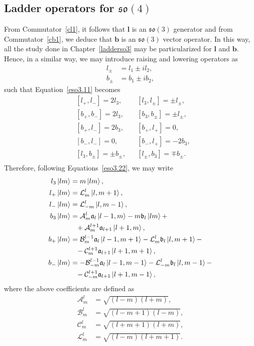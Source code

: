 \documentclass[12pt,a4paper]{report}
\theoremstyle{definition}
\theoremstyle{remark}
\theoremstyle{remark}
\begin{document}
\subsection{Ladder operators for $\mathfrak{so}(4)$}
From Commutator~\ref{cl1}, it follows that $\mathbf{l}$ is an $\mathfrak{so}(3)$ generator and from Commutator~\ref{cb1}, we deduce that $\mathbf{b}$ is an $\mathfrak{so}(3)$ vector operator. In this way, all the study done in Chapter~\ref{ladderso3} may be particularized for $\mathbf{l}$ and $\mathbf{b}$. Hence, in a similar way, we may introduce raising and lowering operators as
\begin{align*}
l_\pm&=l_1\pm il_2,\\
b_\pm&=b_1\pm ib_2,
\end{align*}
such that Equation~\ref{eso3.11} becomes
\begin{equation}\label{eso4.6}
\begin{aligned}
&[l_+,l_-]=2l_3, && [l_3,l_\pm]=\pm l_\pm,\\
&[b_+,b_-]=2l_3, && [b_3,b_\pm]=\pm l_\pm,\\
&[b_+,l_-]=2b_3, &&[b_+,l_+]=0, \\
&[b_-,l_-]=0, &&[b_-,l_+]=-2b_3, \\
&[l_3,b_\pm]=\pm b_\pm, &&[l_\pm,b_3]=\mp b_\pm. \\
\end{aligned}
\end{equation}
Therefore, following Equations~\ref{eso3.22}, we may write
\begin{align*}
l_3\ket{lm}&=m\ket{lm},\\
l_+\ket{lm}&=\mathcal{L}_m^l\ket{l,m+1},\\
l_-\ket{lm}&=\mathcal{L}_{-m}^l\ket{l,m-1},\\
b_3\ket{lm}&=\mathcal{A}_m^l\mathfrak{a}_l\ket{l-1,m}-m\mathfrak{b}_l\ket{lm}+\\
&\phantom{=}+\mathcal{A}_m^{l+1}\mathfrak{a}_{l+1}\ket{l+1,m},\\
b_+\ket{lm}&=\mathcal{B}_m^{l-1}\mathfrak{a}_l\ket{l-1,m+1}-\mathcal{L}_m^l\mathfrak{b}_l\ket{l,m+1}-\\
&\phantom{=}-\mathcal{C}_m^{l+1}\mathfrak{a}_{l+1}\ket{l+1,m+1},\\
b_-\ket{lm}&=-\mathcal{B}_{-m}^{l-1}\mathfrak{a}_l\ket{l-1,m-1}-\mathcal{L}_{-m}^l\mathfrak{b}_l\ket{l,m-1}-\\
&\phantom{=}-\mathcal{C}_{-m}^{l+1}\mathfrak{a}_{l+1}\ket{l+1,m-1},
\end{align*}
where the above coefficients are defined as
\begin{equation}\label{eso4.7}
\begin{aligned}
\mathcal{A}_m^l&=\sqrt{(l-m)(l+m)},\\
\mathcal{B}_m^l&=\sqrt{(l-m+1)(l-m)},\\
\mathcal{C}_m^l&=\sqrt{(l+m+1)(l+m)},\\
\mathcal{L}_m^l&=\sqrt{(l-m)(l+m+1)}.
\end{aligned}
\end{equation}
\end{document}
